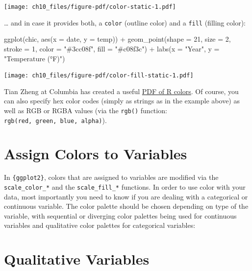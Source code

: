 \documentclass[
  letterpaper,
  DIV=11,
  numbers=noendperiod]{scrreprt}
\newenvironment{Shaded}{\begin{snugshade}}{\end{snugshade}}
\newcommand{\AttributeTok}[1]{\textcolor[rgb]{0.40,0.45,0.13}{#1}}
\newcommand{\DecValTok}[1]{\textcolor[rgb]{0.68,0.00,0.00}{#1}}
\newcommand{\FunctionTok}[1]{\textcolor[rgb]{0.28,0.35,0.67}{#1}}
\newcommand{\NormalTok}[1]{\textcolor[rgb]{0.00,0.23,0.31}{#1}}
\newcommand{\SpecialCharTok}[1]{\textcolor[rgb]{0.37,0.37,0.37}{#1}}
\newcommand{\StringTok}[1]{\textcolor[rgb]{0.13,0.47,0.30}{#1}}
\begin{document}
\texttt{[image: ch10\_files/figure-pdf/color-static-1.pdf]}

\ldots{} and in case it provides both, a \texttt{color} (outline color)
and a \texttt{fill} (filling color):

\begin{Shaded}
\begin{Highlighting}[]
\FunctionTok{ggplot}\NormalTok{(chic, }\FunctionTok{aes}\NormalTok{(}\AttributeTok{x =}\NormalTok{ date, }\AttributeTok{y =}\NormalTok{ temp)) }\SpecialCharTok{+}
  \FunctionTok{geom\_point}\NormalTok{(}\AttributeTok{shape =} \DecValTok{21}\NormalTok{, }\AttributeTok{size =} \DecValTok{2}\NormalTok{, }\AttributeTok{stroke =} \DecValTok{1}\NormalTok{,}
             \AttributeTok{color =} \StringTok{"\#3cc08f"}\NormalTok{, }\AttributeTok{fill =} \StringTok{"\#c08f3c"}\NormalTok{) }\SpecialCharTok{+}
  \FunctionTok{labs}\NormalTok{(}\AttributeTok{x =} \StringTok{"Year"}\NormalTok{, }\AttributeTok{y =} \StringTok{"Temperature (°F)"}\NormalTok{)}
\end{Highlighting}
\end{Shaded}

\texttt{[image: ch10\_files/figure-pdf/color-fill-static-1.pdf]}

Tian Zheng at Columbia has created a useful
\href{http://www.stat.columbia.edu/~tzheng/files/Rcolor.pdf}{PDF of R
colors}. Of course, you can also specify hex color codes (simply as
strings as in the example above) as well as RGB or RGBA values (via the
\texttt{rgb()} function: \texttt{rgb(red,\ green,\ blue,\ alpha)}).

\section{Assign Colors to Variables}\label{assign-colors-to-variables}

In \texttt{\{ggplot2\}}, colors that are assigned to variables are
modified via the \texttt{scale\_color\_*} and the
\texttt{scale\_fill\_*} functions. In order to use color with your data,
most importantly you need to know if you are dealing with a categorical
or continuous variable. The color palette should be chosen depending on
type of the variable, with sequential or diverging color palettes being
used for continuous variables and qualitative color palettes for
categorical variables:

\section{Qualitative Variables}\label{qualitative-variables}
\end{document}
